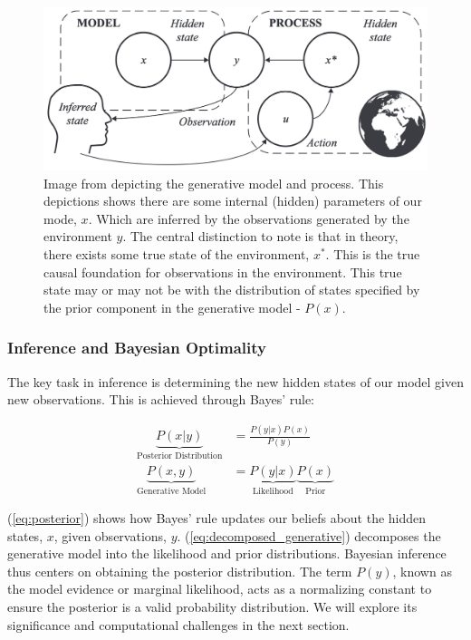 \documentclass{article}
\newcommand{\refp}[1]{(\ref{#1})}
\begin{document}
\begin{figure}[htbp]
    \centering
    \includegraphics[scale=0.6]{images/generative_process.png}
    \caption{Image from \citet{parr2022ActiveInference} depicting the generative model and process. This depictions shows there are some internal (hidden) parameters of our mode, $x$. Which are inferred by the observations generated by the environment $y$. The central distinction to note is that in theory, there exists some true state of the environment, $x^*$. This is the true causal foundation for observations in the environment. This true state may or may not be with the distribution of states specified by the prior component in the generative model - $P(x)$.}
    \label{fig:generative_process} 
\end{figure}

\subsubsection{Inference and Bayesian Optimality}

The key task in inference is determining the new hidden states of our model given new observations. This is achieved through Bayes' rule:

\begin{align}
	\underbrace{P(x | y )}_{\text{Posterior Distribution}} &= \frac{P(y | x)P(x)}{P(y)} \label{eq:posterior} \\
	\underbrace{P(x, y)}_{\text{Generative Model}} &= \underbrace{P(y | x)}_{\text{Likelihood}}\underbrace{P(x)}_{\text{Prior}} \label{eq:decomposed_generative}
\end{align}

\refp{eq:posterior} shows how Bayes' rule updates our beliefs about the hidden states, $x$, given observations, $y$. \refp{eq:decomposed_generative} decomposes the generative model into the likelihood and prior distributions. Bayesian inference thus centers on obtaining the posterior distribution. The term $P(y)$, known as the model evidence or marginal likelihood, acts as a normalizing constant to ensure the posterior is a valid probability distribution. We will explore its significance and computational challenges in the next section.
\end{document}

